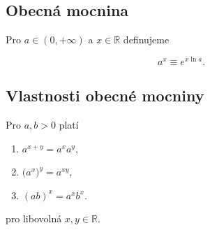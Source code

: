 \subsection*{Obecná mocnina}

Pro $a\in(0,+\infty)$ a $x\in\mathbb{R}$ definujeme

\[ a^x \equiv e^{x\ln a}. \]

\subsection*{Vlastnosti obecné mocniny}

Pro $a,b > 0$ platí

\begin{enumerate}
    \item $a^{x+y} = a^x a^y$,
    \item $\big(a^x\big)^y = a^{xy}$,
    \item $(ab)^x = a^x b^x$.
\end{enumerate}

\noindent pro libovolná $x,y\in\mathbb{R}$.

\pagebreak